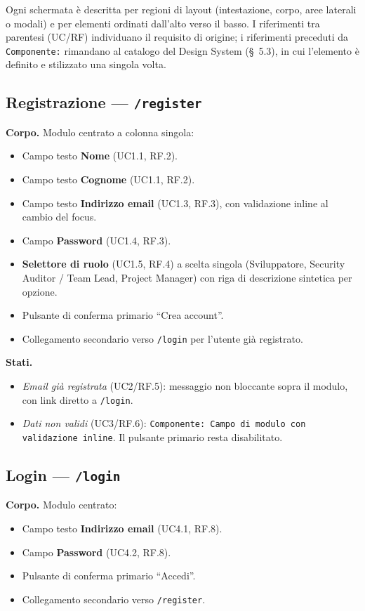 \documentclass[11pt,a4paper]{article}
\begin{document}
Ogni schermata è descritta per regioni di layout (intestazione, corpo, aree laterali o modali) e per elementi ordinati dall'alto verso il basso. I riferimenti tra parentesi (UC/RF) individuano il requisito di origine; i riferimenti preceduti da \texttt{Componente:} rimandano al catalogo del Design System (\S~5.3), in cui l'elemento è definito e stilizzato una singola volta.

\subsection{Registrazione --- \texttt{/register}}

\textbf{Corpo.} Modulo centrato a colonna singola:
\begin{itemize}
    \item Campo testo \textbf{Nome} (UC1.1, RF.2).
    \item Campo testo \textbf{Cognome} (UC1.1, RF.2).
    \item Campo testo \textbf{Indirizzo email} (UC1.3, RF.3), con validazione inline al cambio del focus.
    \item Campo \textbf{Password} (UC1.4, RF.3).
    \item \textbf{Selettore di ruolo} (UC1.5, RF.4) a scelta singola (Sviluppatore, Security Auditor / Team Lead, Project Manager) con riga di descrizione sintetica per opzione.
    \item Pulsante di conferma primario ``Crea account''.
    \item Collegamento secondario verso \texttt{/login} per l'utente già registrato.
\end{itemize}

\textbf{Stati.}
\begin{itemize}
    \item \emph{Email già registrata} (UC2/RF.5): messaggio non bloccante sopra il modulo, con link diretto a \texttt{/login}.
    \item \emph{Dati non validi} (UC3/RF.6): \texttt{Componente: Campo di modulo con validazione inline}. Il pulsante primario resta disabilitato.
\end{itemize}

\subsection{Login --- \texttt{/login}}

\textbf{Corpo.} Modulo centrato:
\begin{itemize}
    \item Campo testo \textbf{Indirizzo email} (UC4.1, RF.8).
    \item Campo \textbf{Password} (UC4.2, RF.8).
    \item Pulsante di conferma primario ``Accedi''.
    \item Collegamento secondario verso \texttt{/register}.
\end{itemize}
\end{document}
